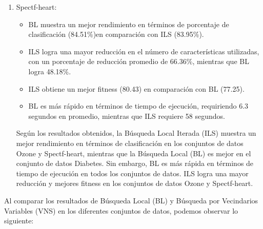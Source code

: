 \begin{enumerate}
\item Spectf-heart:

\begin{itemize}
	\item BL muestra un mejor rendimiento en términos de porcentaje de clasificación (84.51\%)en comparación con ILS (83.95\%).

 \item ILS logra una mayor reducción en el número de características utilizadas, con un porcentaje de reducción promedio de 66.36\%, mientras que BL logra 48.18\%.

\item  ILS obtiene un mejor fitness (80.43) en comparación con BL (77.25).

\item  BL es más rápido en términos de tiempo de ejecución, requiriendo 6.3 segundos en promedio, mientras que ILS requiere 58 segundos.
\end{itemize}
Según los resultados obtenidos, la Búsqueda Local Iterada (ILS) muestra un mejor rendimiento en términos de clasificación en los conjuntos de datos Ozone y Spectf-heart, mientras que la Búsqueda Local (BL) es mejor en el conjunto de datos Diabetes. Sin embargo, BL es más rápida en términos de tiempo de ejecución en todos los conjuntos de datos. ILS logra una mayor reducción y mejores fitness en los conjuntos de datos Ozone y Spectf-heart.

\end{enumerate}


Al comparar los resultados de Búsqueda Local (BL) y Búsqueda por Vecindarios Variables (VNS) en los diferentes conjuntos de datos, podemos observar lo siguiente:


